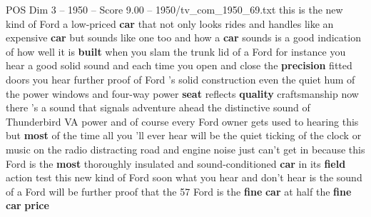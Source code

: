 \begin{textsample}{POS Dim 3 – 1950 – Score 9.00 – 1950/tv\_com\_1950\_69.txt}  \label{ex:f3_pos_003}
this is the new kind of Ford a low-priced \textbf{car} that not only looks rides and handles like an expensive \textbf{car} but sounds like one too and how a \textbf{car} sounds is a good indication of how well it is \textbf{built} when you slam the trunk lid of a Ford for instance you hear a good solid sound and each time you open and close the \textbf{precision} fitted doors you hear further proof of Ford 's solid construction even the quiet hum of the power windows and four-way power \textbf{seat} reflects \textbf{quality} craftsmanship now there 's a sound that signals adventure ahead the distinctive sound of Thunderbird VA power and of course every Ford owner gets used to hearing this but \textbf{most} of the time all you 'll ever hear will be the quiet ticking of the clock or music on the radio distracting road and engine noise just can't get in because this Ford is the \textbf{most} thoroughly insulated and sound-conditioned \textbf{car} in its \textbf{field} action test this new kind of Ford soon what you hear and don't hear is the sound of a Ford will be further proof that the 57 Ford is the \textbf{fine} \textbf{car} at half the \textbf{fine} \textbf{car} \textbf{price}

\end{textsample}
